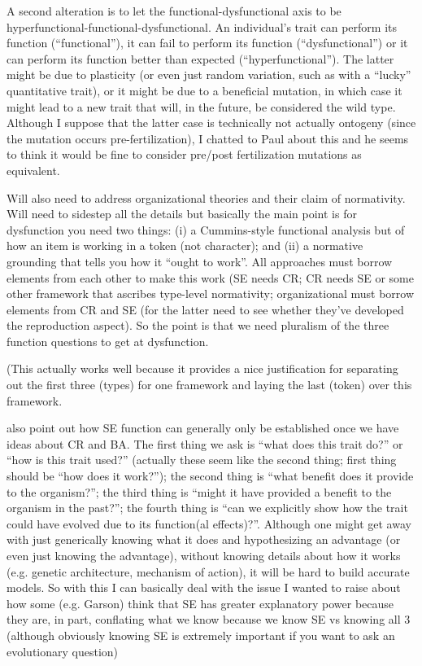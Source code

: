 \documentclass{article}
\begin{document}
A second alteration is to let the functional-dysfunctional axis to be hyperfunctional-functional-dysfunctional. An individual's trait can perform its function (``functional''), it can fail to perform its function (``dysfunctional'') or it can perform its function better than expected (``hyperfunctional''). The latter might be due to plasticity (or even just random variation, such as with a ``lucky'' quantitative trait), or it might be due to a beneficial mutation, in which case it might lead to a new trait that will, in the future, be considered the wild type. Although I suppose that the latter case is technically not actually ontogeny (since the mutation occurs pre-fertilization), I chatted to Paul about this and he seems to think it would be fine to consider pre/post fertilization mutations as equivalent.

Will also need to address organizational theories and their claim of normativity. Will need to sidestep all the details but basically the main point is for dysfunction you need two things: (i) a Cummins-style functional analysis but of how an item is working in a token (not character); and (ii) a normative grounding that tells you how it ``ought to work''. All approaches must borrow elements from each other to make this work (SE needs CR; CR needs SE or some other framework that ascribes type-level normativity; organizational must borrow elements from CR and SE (for the latter need to see whether they've developed the reproduction aspect). So the point is that we need pluralism of the three function questions to get at dysfunction.

(This actually works well because it provides a nice justification for separating out the first three (types) for one framework and laying the last (token) over this framework.

also point out how SE function can generally only be established once we have ideas about CR and BA. The first thing we ask is ``what does this trait do?'' or ``how is this trait used?'' (actually these seem like the second thing; first thing should be ``how does it work?''); the second thing is ``what benefit does it provide to the organism?''; the third thing is ``might it have provided a benefit to the organism in the past?''; the fourth thing is ``can we explicitly show how the trait could have evolved due to its function(al effects)?''.
Although one might get away with just generically knowing what it does and hypothesizing an advantage (or even just knowing the advantage), without knowing details about how it works (e.g. genetic architecture, mechanism of action), it will be hard to build accurate models.
So with this I can basically deal with the issue I wanted to raise about how some (e.g. Garson) think that SE has greater explanatory power because they are, in part, conflating what we know because we know SE vs knowing all 3 (although obviously knowing SE is extremely important if you want to ask an evolutionary question)
\end{document}
